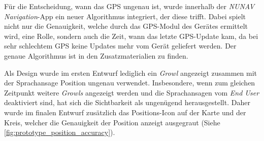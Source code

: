 Für die Entscheidung, wann das GPS ungenau ist, wurde innerhalb der \textit{NUNAV Navigation}-App ein neuer Algorithmus integriert, der diese trifft. Dabei spielt nicht nur die Genauigkeit, welche durch das GPS-Modul des Gerätes ermittelt wird, eine Rolle, sondern auch die Zeit, wann das letzte GPS-Update kam, da bei sehr schlechtem GPS keine Updates mehr vom Gerät geliefert werden. Der genaue Algorithmus ist in den Zusatzmaterialien zu finden.

Als Design wurde im ersten Entwurf lediglich ein \textit{Growl} angezeigt zusammen mit der Sprachansage \glqq Position ungenau\grqq{} verwendet. Insbesondere, wenn zum gleichen Zeitpunkt weitere \textit{Growls} angezeigt werden und die Sprachansagen vom \textit{End User} deaktiviert sind, hat sich die Sichtbarkeit als ungenügend herausgestellt. Daher wurde im finalen Entwurf zusätzlich das Positions-Icon auf der Karte und der Kreis, welcher die Genauigkeit der Position anzeigt ausgegraut (Siehe \autoref{fig:prototype_position_accuracy}).